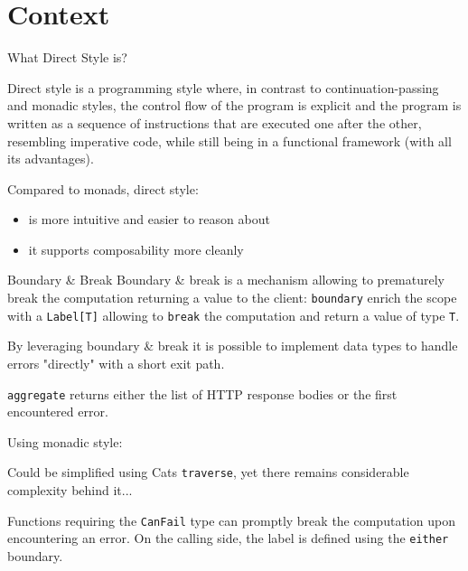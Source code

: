 \documentclass[aspectratio=1610,xcolor=dvipsnames,handout]{beamer}
\begin{document}
\section{Context}
\begin{frame}{What Direct Style is?}
  \begin{block}{}
    Direct style is a programming style where, in contrast to continuation-passing and monadic styles, the control flow of the program is explicit and the program is written as a sequence of instructions that are executed one after the other, resembling imperative code, while still being in a functional framework (with all its advantages).
  \end{block}
  Compared to monads, direct style:
  \begin{itemize}
    \item is more intuitive and easier to reason about
    \item it supports composability more cleanly
  \end{itemize}
\end{frame}
%
\begin{frame}{Boundary \& Break \cite{scalar-gears}}
  Boundary \& break is a mechanism allowing to prematurely break the computation returning a value to the client: \texttt{boundary} enrich the scope with a \texttt{Label[T]} allowing to \texttt{break} the computation and return a value of type \texttt{T}.
  
  By leveraging boundary \& break it is possible to implement data types to handle errors "directly" with a short exit path. 
\end{frame}
%
\begin{frame}
  \footnotesize
  \texttt{aggregate} returns either the list of HTTP response bodies or the first encountered error.

  

  \pause
  Using monadic style:
  

  \pause
  Could be simplified using Cats \texttt{traverse}, yet there remains considerable complexity behind it...
  
\end{frame}
%
\begin{frame}
  \small
  Functions requiring the \texttt{CanFail} type can promptly break the computation upon encountering an error.
  On the calling side, the label is defined using the \texttt{either} boundary.
  
  
\end{frame}
\end{document}
